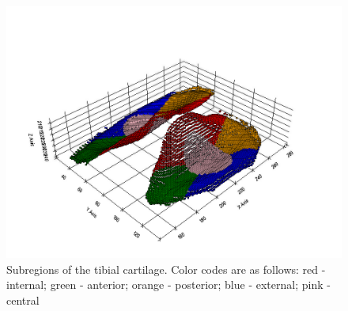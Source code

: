 \begin{figure}[]
	\centering
	\includegraphics[width=\linewidth]{./figures/tibial_subregions}
	\caption{Subregions of the tibial cartilage. Color codes are as follows: red - internal; green - anterior; orange - posterior; blue - external; pink - central}
	\label{fig:tibial_subregions}
\end{figure}